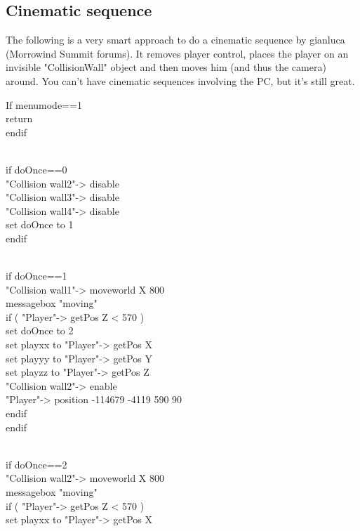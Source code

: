 

\hypertarget{cinematic-sequence}{%
\subsection{\texorpdfstring{\hfill\break
Cinematic sequence}{ Cinematic sequence}}\label{cinematic-sequence}}

The following is a very smart approach to do a cinematic sequence by
gianluca (Morrowind Summit forums). It removes player control, places
the player on an invisible "CollisionWall" object and then moves him
(and thus the camera) around. You can't have cinematic sequences
involving the PC, but it's still great.

If menumode==1\\
return\\
endif\\
\strut \\
if doOnce==0\\
"Collision wall2"-> disable\\
"Collision wall3"-> disable\\
"Collision wall4"-> disable\\
set doOnce to 1\\
endif\\
\strut \\
if doOnce==1\\
"Collision wall1"-> moveworld X 800\\
messagebox "moving"\\
if ( "Player"-> getPos Z < 570 )\\
set doOnce to 2\\
set playxx to "Player"-> getPos X\\
set playyy to "Player"-> getPos Y\\
set playzz to "Player"-> getPos Z\\
"Collision wall2"-> enable\\
"Player"-> position -114679 -4119 590 90\\
endif\\
endif\\
\strut \\
if doOnce==2\\
"Collision wall2"-> moveworld X 800\\
messagebox "moving"\\
if ( "Player"-> getPos Z < 570 )\\
set playxx to "Player"-> getPos X\\
